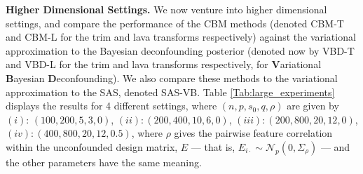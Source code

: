 \documentclass[11pt]{article}
\newcommand{\subparspacenonewline}{\vspace{3mm}}
\newcommand{\N}{\mathcal{N}}
\begin{document}
\begin{table}[h]
\centering
{}
\caption{Estimates of the relevant metrics over 100 realisations of the data described in the text. $(n, p, s_0, q) $ are given by $(100, 200, 5, 3)$.}
\label{Tab:small_exp_mcmc}
\end{table}
\subparspacenonewline
{\bf Higher Dimensional Settings. }
We now venture into higher dimensional settings, and compare the performance of the CBM methods (denoted CBM-T and CBM-L for the trim and lava transforms respectively) against the variational approximation to the Bayesian deconfounding posterior (denoted now by VBD-T and VBD-L for the trim and lava transforms respectively, for {\bf V}ariational {\bf B}ayesian {\bf D}econfounding). We also compare these methods to the variational approximation to the SAS, denoted SAS-VB.
Table \ref{Tab:large_experiments} displays the results for 4 different settings, where $(n, p, s_0, q, \rho) $ are given by $(i)$: $(100, 200, 5, 3, 0)$, $(ii): (200, 400, 10, 6, 0)$, $(iii): (200, 800, 20, 12, 0)$, $(iv): (400, 800, 20, 12, 0.5)$, where $\rho$ gives the pairwise feature correlation within the unconfounded design matrix, $E$ --- that is, $E_{i \cdot} \sim \N_p(0, \Sigma_\rho)$ --- and the other parameters have the same meaning.
\end{document}
